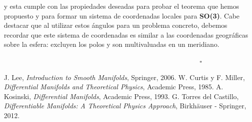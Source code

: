 \documentclass[a4paper,10pt]{article}
\numberwithin{equation}{section}
\begin{document}
y esta cumple con las propiedades deseadas para probar el teorema que hemos propuesto 
y para formar un sistema de coordenadas locales para \textbf{SO(3)}. Cabe destacar 
que al utilizar estos ángulos para un problema concreto, debemos recordar que este 
sistema de coordenadas es similar a las coordenadas geográficas sobre la esfera: excluyen 
los polos y son multivaluadas en un meridiano.

$\hspace{12cm} \square$

\begin{thebibliography}{10}
J. Lee, \emph{Introduction to Smooth Manifolds}, Springer, 2006.
W. Curtis y F. Miller, \emph{Differential Manifolds and Theoretical Physics}, Academic 
Press, 1985.
A. Kosinski, \emph{Differential Manifolds}, Academic Press, 1993.
G. Torres del Castillo, \emph{Differentiable Manifolds: A Theoretical Physics Approach}, 
Birkhäuser - Springer, 2012.
\end{thebibliography}
\end{document}
